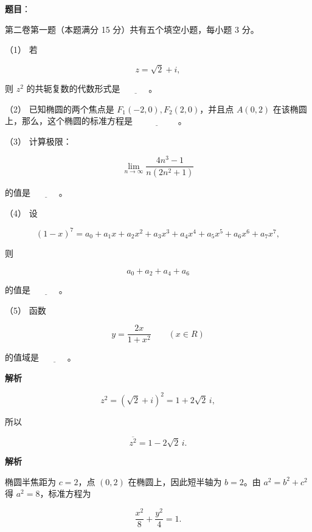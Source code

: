 \begin{answer}

\textbf{题目}：

第二卷第一题（本题满分 15 分）共有五个填空小题，每小题 3 分。

（1） 若

\nopagebreak[4]
\[
z=\sqrt2+i,
\]

则 $z^2$ 的共轭复数的代数形式是 $\underline{\hspace{3em}}$。

（2） 已知椭圆的两个焦点是 $F_1(-2,0),F_2(2,0)$，并且点 $A(0,2)$ 在该椭圆上，那么，这个椭圆的标准方程是 $\underline{\hspace{5em}}$。

（3） 计算极限：

\nopagebreak[4]
\[
\lim_{n\to\infty}\frac{4n^3-1}{n(2n^2+1)}
\]

的值是 $\underline{\hspace{3em}}$。

（4） 设

\nopagebreak[4]
\[
(1-x)^7=a_0+a_1x+a_2x^2+a_3x^3+a_4x^4+a_5x^5+a_6x^6+a_7x^7,
\]

则

\nopagebreak[4]
\[
a_0+a_2+a_4+a_6
\]

的值是 $\underline{\hspace{3em}}$。

（5） 函数

\nopagebreak[4]
\[
y=\frac{2x}{1+x^2}\qquad(x\in R)
\]

的值域是 $\underline{\hspace{3em}}$。

\textbf{解析}


\nopagebreak[4]
\[
z^2=(\sqrt2+i)^2=1+2\sqrt2\,i,
\]

所以

\nopagebreak[4]
\[
\overline{z^2}=1-2\sqrt2\,i.
\]


\textbf{解析}

椭圆半焦距为 $c=2$，点 $(0,2)$ 在椭圆上，因此短半轴为 $b=2$。由 $a^2=b^2+c^2$ 得 $a^2=8$，标准方程为

\nopagebreak[4]
\[
\frac{x^2}{8}+\frac{y^2}{4}=1.
\]


\end{answer}
